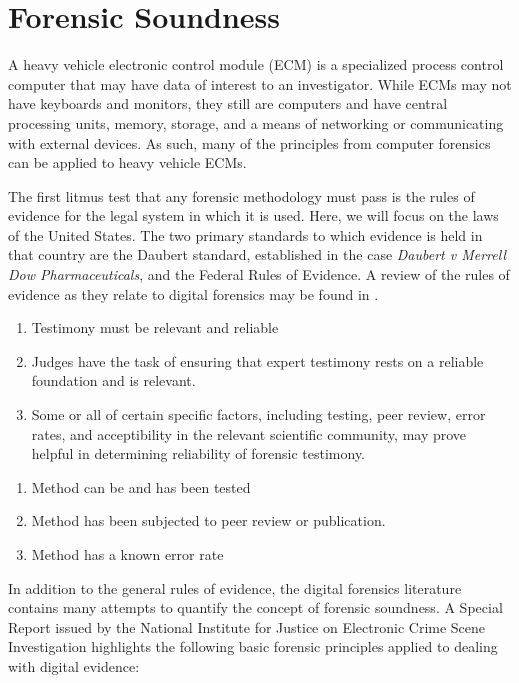 \section{Forensic Soundness}

A heavy vehicle electronic control module (ECM) is a specialized process control computer that may have data of interest to an investigator. 
While ECMs may not have keyboards and monitors, they still are computers and have central processing units, memory, storage, and a means of 
networking or communicating with external devices. As such, many of the principles from computer forensics can be applied to heavy vehicle ECMs.

The first litmus test that any forensic methodology must pass is the rules of evidence for the legal system in which it is used. Here, we will
focus on the laws of the United States. The two primary standards to which evidence is held in that country are the Daubert standard, established
in the case \emph{Daubert v Merrell Dow Pharmaceuticals}, and the Federal Rules of Evidence. A review of the rules of evidence as they relate to 
digital forensics may be found in \cite{meyers2005}.

\begin{enumerate}
  \item Testimony must be relevant and reliable
  \item Judges have the task of ensuring that expert testimony rests on a reliable
        foundation and is relevant.
  \item Some or all of certain specific factors, including testing, peer review, error
        rates, and acceptibility in the relevant scientific community, may prove helpful
        in determining reliability of forensic testimony.
\end{enumerate}

\begin{enumerate}
  \item Method can be and has been tested
  \item Method has been subjected to peer review or publication.
  \item Method has a known error rate
\end{enumerate}

In addition to the general rules of evidence, the digital forensics literature contains many attempts to quantify the concept of forensic soundness.
A Special Report issued by the National Institute for Justice on Electronic Crime Scene Investigation \cite{NIJ2008} highlights the following basic forensic 
principles applied to dealing with digital evidence:

